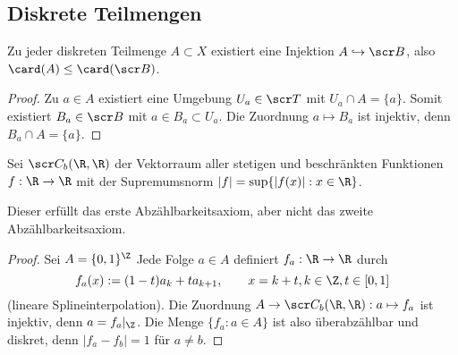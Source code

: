 
\subsection{Diskrete Teilmengen}

\begin{lem}
	Zu jeder diskreten Teilmenge $A \subset X$ existiert eine Injektion $A \injto \scr B$, also $\card (A) \le \card(\scr B)$.
	\begin{proof}
		Zu $a \in A$ existiert eine Umgebung $U_a \in \scr T$ mit $U_a \cap A = \{a\}$.
		Somit existiert $B_a \in \scr B$ mit $a \in B_a \subset U_a$.
		Die Zuordnung $a \mapsto B_a$ ist injektiv, denn $B_a \cap A = \{a\}$.
	\end{proof}
\end{lem}

\begin{st}
	Sei $\scr C_b(\R, \R)$ der Vektorraum aller stetigen und beschränkten Funktionen $f: \R \to \R$ mit der Supremumsnorm $|f| = \sup \{|f(x)| : x \in \R \}$.

	Dieser erfüllt das erste Abzählbarkeitsaxiom, aber nicht das zweite Abzählbarkeitsaxiom.
	\begin{proof}
		Sei $A = \{0, 1\}^\Z$ %
		Jede Folge $a \in A$ definiert $f_a : \R \to \R$ durch
		\[
			f_a(x)
			:= (1-t)a_k + t a_{k+1},
			\qquad x = k+t, k \in \Z, t \in [0,1]
		\]
		(lineare Splineinterpolation).
		Die Zuordnung $A \to \scr C_b (\R, \R) : a \mapsto f_a$ ist injektiv, denn $a = f_a|_\Z$.
		Die Menge $\{f_a : a \in A\}$ ist also überabzählbar und diskret, denn $|f_a - f_b| = 1$ für $a\neq b$.
	\end{proof}
\end{st}

